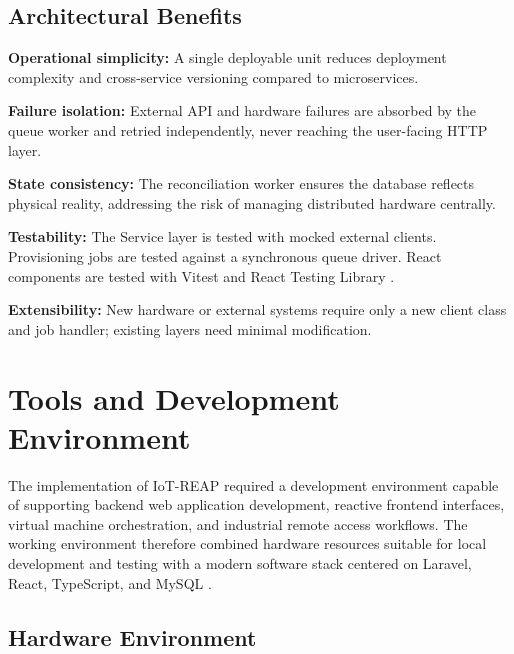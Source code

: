 \subsection{Architectural Benefits}

\textbf{Operational simplicity:} A single deployable unit reduces deployment
complexity and cross-service versioning compared to microservices.

\textbf{Failure isolation:} External API and hardware failures are absorbed by
the queue worker and retried independently, never reaching the user-facing HTTP
layer.

\textbf{State consistency:} The reconciliation worker ensures the database
reflects physical reality, addressing the risk of managing distributed hardware
centrally.

\textbf{Testability:} The Service layer is tested with mocked external clients.
Provisioning jobs are tested against a synchronous queue driver. React
components are tested with Vitest and React Testing Library
{\footnotesize\cite{vitest-docs,phpunit-docs}}.

\textbf{Extensibility:} New hardware or external systems require only a new
client class and job handler; existing layers need minimal modification.

\section{Tools and Development Environment}
\label{sec:tools}

The implementation of IoT-REAP required a development environment capable of
supporting backend web application development, reactive frontend interfaces,
virtual machine orchestration, and industrial remote access workflows. The
working environment therefore combined hardware resources suitable for local
development and testing with a modern software stack centered on Laravel,
React, TypeScript, and MySQL
  {\footnotesize\cite{laravel-docs,react-docs,typescript-docs,mysql-docs}}.

\subsection{Hardware Environment}

